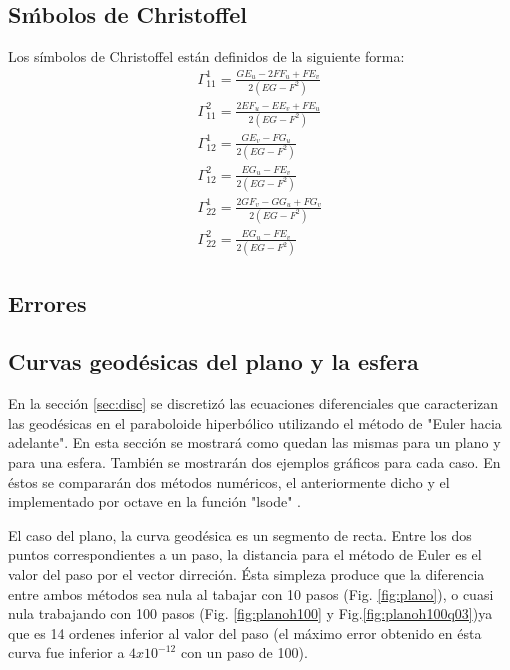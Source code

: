 \documentclass{endm}
\begin{document}
\subsection*{S\'mbolos de Christoffel} \label{simbolosCr}

Los s\'imbolos de Christoffel est\'an definidos de la siguiente forma:
{\small
\begin{align} 
\Gamma_{11}^1 = \frac{GE_u - 2 FF_u + FE_v}{2(EG - F^2)} \label{Gam_11_1}\\
\Gamma_{11}^2 = \frac{2EF_u - EE_v + FE_u}{2(EG - F^2)}\label{Gam_11_2}\\
\Gamma_{12}^1 = \frac{GE_v - FG_u}{2(EG - F^2)} \label{Gam_12_1}\\
\Gamma_{12}^2 = \frac{EG_u - FE_v}{2(EG - F^2)}\label{Gam_12_2}\\
\Gamma_{22}^1 = \frac{2GF_v - GG_u + FG_v}{2(EG - F^2)} \label{Gam_22_1}\\
\Gamma_{22}^2 = \frac{EG_u - FE_v}{2(EG - F^2)}\label{Gam_22_2}
\end{align}
}

\subsection*{Errores}\label{subsec:errores}

\subsection*{Curvas geod\'esicas del plano y la esfera}
En la secci\'on \ref{sec:disc} se discretiz\'o las ecuaciones diferenciales que caracterizan las geod\'esicas en el paraboloide hiperb\'olico utilizando el m\'etodo de "Euler hacia adelante". En esta secci\'on se mostrar\'a como quedan las mismas para un plano y para una esfera. Tambi\'en se mostrar\'an dos ejemplos gr\'aficos para cada caso. En \'estos se comparar\'an dos m\'etodos num\'ericos, el anteriormente dicho y el implementado por octave en la funci\'on "lsode"\cite{bib:lsode} \cite{bib:lsodeimp}.

El caso del plano, la curva geod\'esica es un segmento de recta. Entre los dos puntos correspondientes a un paso, la distancia para el m\'etodo de Euler es el valor del paso por el vector dirreci\'on. \'Esta simpleza produce que la diferencia entre ambos m\'etodos sea nula al tabajar con 10 pasos (Fig. \ref{fig:plano}), o cuasi nula trabajando con 100 pasos (Fig. \ref{fig:planoh100} y Fig.\ref{fig:planoh100q03})ya que es 14 ordenes inferior al valor del paso (el m\'aximo error obtenido en \'esta curva fue inferior a $4x10^{-12}$ con un paso de 100).
\end{document}
